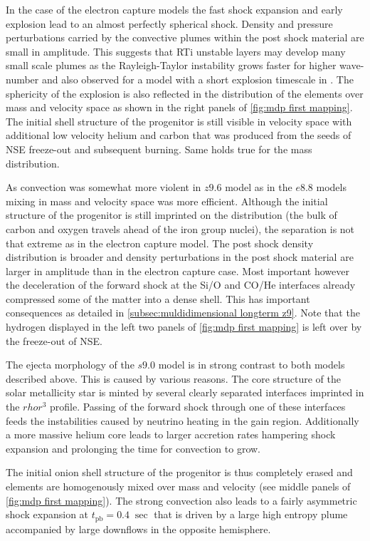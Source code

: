 \documentclass[fleqn,usenatbib]{mnras}
\newcommand{\tpb}{\ensuremath{t_\mathrm{pb}}}
\begin{document}
In the case of the electron capture models the fast shock expansion and early explosion lead to an almost perfectly spherical shock. Density and pressure perturbations carried by the convective plumes within the post shock material are small in amplitude. 
This suggests that RTi unstable layers may develop many small scale plumes as the Rayleigh-Taylor instability grows faster for higher wave-number \cite{Gupta1986,Guilet2009} and also observed for a model with a short explosion timescale in \cite{Kifonidis2003}.
The sphericity of the explosion is also reflected in the distribution of the elements over mass and velocity space as shown in the right panels of \autoref{fig:mdp first mapping}. The initial shell structure of the progenitor is still visible in velocity space with additional low velocity helium and carbon that was produced from the seeds of NSE freeze-out and subsequent burning. Same holds true for the mass distribution. 

As convection was somewhat more violent in $z9.6$ model as in the $e8.8$ models mixing in mass and velocity space was more efficient. Although the initial structure of the progenitor is still imprinted on the distribution (the bulk of carbon and oxygen travels ahead of the iron group nuclei), the separation is not that extreme as in the electron capture model. The post shock density distribution is broader and density perturbations in the post shock material are larger in amplitude than in the electron capture case. Most important however the deceleration of the forward shock at the Si/O and CO/He interfaces already compressed some of the matter into a dense shell. This has important consequences as detailed in \autoref{subsec:muldidimensional longterm z9}.
Note that the hydrogen displayed in the left two panels of \autoref{fig:mdp first mapping} is left over by the freeze-out of NSE. 

The ejecta morphology of the  $s9.0$ model is in strong contrast to both models described above. This is caused by various reasons. 
The core structure of the solar metallicity star is minted by several clearly separated interfaces imprinted in the $rho r^3$ profile. Passing of the forward shock through one of these interfaces feeds the instabilities caused by neutrino heating in the gain region.
Additionally a more massive helium core leads to larger accretion rates hampering shock expansion and prolonging the time for convection to grow.

The initial onion shell structure of the progenitor is thus completely erased and elements are homogenously mixed over mass and velocity (see middle panels of \autoref{fig:mdp first mapping}).
The strong convection also leads to a fairly asymmetric shock expansion at $\tpb=0.4\;\sec$ that is driven by a large high entropy plume accompanied by large downflows in the opposite hemisphere. 
\end{document}
